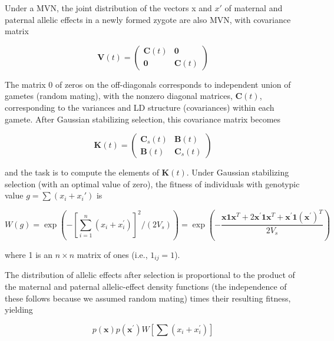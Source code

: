 \documentclass{article}
\begin{document}
Under a MVN, the joint distribution of the vectors x and  $ x' $ of maternal and paternal allelic effects in a newly formed zygote are also MVN, with covariance matrix

\begin{equation}
\mathbf{V}(t)=\begin{pmatrix}\mathbf{C}(t)&\mathbf{0}\\ \mathbf{0}&\mathbf{C}(t)\end{pmatrix}
\tag{28.26a}
\label{eq:28_26a}
\end{equation}

The matrix 0 of zeros on the off-diagonals corresponds to independent union of gametes (random mating), with the nonzero diagonal matrices,  $ \mathbf{C}(t) $, corresponding to the variances and LD structure (covariances) within each gamete. After Gaussian stabilizing selection, this covariance matrix becomes

\begin{equation}
\mathbf{K}(t)=\begin{pmatrix}\mathbf{C}_{s}(t)&\mathbf{B}(t)\\ \mathbf{B}(t)&\mathbf{C}_{s}(t)\end{pmatrix}
\tag{28.26b}
\label{eq:28_26b}
\end{equation}

and the task is to compute the elements of  $ \mathbf{K}(t) $. Under Gaussian stabilizing selection (with an optimal value of zero), the fitness of individuals with genotypic value  $ g = \sum(x_i + x_i') $ is

\begin{equation}
W(g)=\exp\left(-\left[\sum_{i=1}^{n}(x_{i}+x_{i}^{\prime})\right]^{2}\bigg/(2V_{s})\right)=\exp\left(-\frac{\mathbf{x}\mathbf{1}\mathbf{x}^{T}+2\mathbf{x}^{\prime}\mathbf{1}\mathbf{x}^{T}+\mathbf{x}^{\prime}\mathbf{1}(\mathbf{x}^{\prime})^{T}}{2V_{s}}\right)
\tag{28.26c}
\label{eq:28_26c}
\end{equation}

where 1 is an  $ n \times n $ matrix of ones (i.e.,  $ 1_{ij} = 1 $).

The distribution of allelic effects after selection is proportional to the product of the maternal and paternal allelic-effect density functions (the independence of these follows because we assumed random mating) times their resulting fitness, yielding

\begin{equation}
p(\mathbf{x})p(\mathbf{x}^{\prime})W\left[\sum(x_{i}+x_{i}^{\prime})\right]
\tag{28.26d}
\label{eq:28_26d}
\end{equation}
\end{document}
